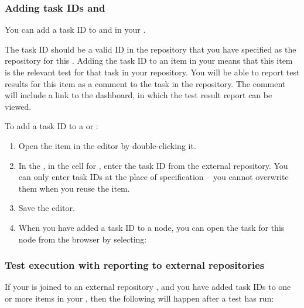 \subsubsection{Adding task IDs \gdsuites{} and \gdcases{}}
\label{TasksALMAddTask}

You can add a task ID to \gdcases{} and \gdsuites{} in your \gdproject{}. 

The task ID should be a valid ID in the repository that you have specified as the repository for this \gdproject{} . Adding the task ID to an item in your \gdproject{} means that this item is the relevant test for that task in your repository. You will be able to report test results for this item as a comment to the task in the repository. The comment will include a link to the dashboard, in which the test result report can be viewed.

To add a task ID to a \gdcase{} or \gdsuite{}:
\begin{enumerate}
\item Open the item in the editor by double-clicking it.
\item In the \gdpropview{}, in the cell for , enter the task ID from the external repository. You can only enter task IDs at the place of specification -- you cannot overwrite them when you reuse the item.
\item Save the editor. 
\item When you have added a task ID to a node, you can open the task for this node from the browser by selecting:\\
\end{enumerate}


\subsubsection{Test execution with reporting to external repositories}
If your \gdproject{} is joined to an external repository , and you have added task IDs to one or more items in your \gdproject{} , then the following will happen after a test has run:

